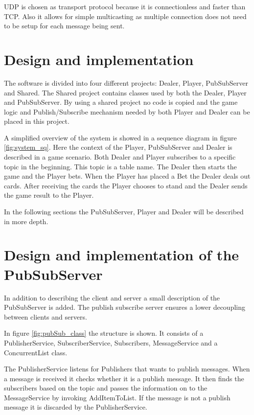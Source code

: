 
UDP is chosen as transport protocol because it is connectionless and faster than TCP. Also it allows for simple multicasting as multiple connection does not need to be setup for each message being sent.

\section{Design and implementation}
The software is divided into four different projects: Dealer, Player, PubSubServer and Shared. The Shared project contains classes used by both the Dealer, Player and PubSubServer. By using a shared project no code is copied and the game logic and Publish/Subscribe mechanism needed by both Player and Dealer can be placed in this project.

A simplified overview of the system is showed in a sequence diagram in figure \ref{fig:system_sq}. Here the context of the Player, PubSubServer and Dealer is described in a game scenario. Both Dealer and Player subscribes to a specific topic in the beginning. This topic is a table name. The Dealer then starts the game and the Player bets. When the Player has placed a Bet the Dealer deals out cards. After receiving the cards the Player chooses to stand and the Dealer sends the game result to the Player. 

\FloatBarrier

In the following sections the PubSubServer, Player and Dealer will be described in more depth.

\section{Design and implementation of the PubSubServer}
In addition to describing the client and server a small description of the PubSubServer is added. The publish subscribe server ensures a lower decoupling between clients and servers.


In figure \ref{fig:pubSub_class} the structure is shown. It consists of a PublisherService, SubscriberService, Subscribers, MessageService and a ConcurrentList class. 

The PublisherService listens for Publishers that wants to publish messages. When a message is received it checks whether it is a publish message. It then finds the subscribers based on the topic and passes the information on to the MessageService by invoking AddItemToList. If the message is not a publish message it is discarded by the PublisherService.

